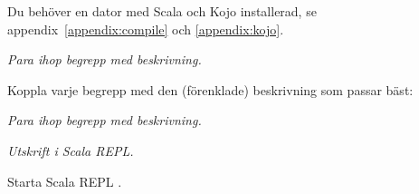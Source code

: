 
\ifPreSolution
\Exercise{\ExeWeekONE}\label{exe:W01}

\begin{Goals}

\end{Goals}

\begin{Preparations}
\item {}
\item Du behöver en dator med Scala och Kojo installerad, se appendix~\ref{appendix:compile} och  \ref{appendix:kojo}.
\end{Preparations}

\else

\ExerciseSolution{\ExeWeekONE}

\fi  %


\BasicTasks


\def\what{\emph{Para ihop begrepp med beskrivning.}}

\QUESTBEGIN

\Task \what

\vspace{1em}\noindent Koppla varje begrepp med den (förenklade) beskrivning som passar bäst: 

\begin{ConceptConnections}

\end{ConceptConnections}

\SOLUTION

\TaskSolved \what

\begin{ConceptConnections}

\end{ConceptConnections}

\QUESTEND






\def\what{\emph{Utskrift i Scala REPL.}}

\QUESTBEGIN

\Task \what 

\vspace{1em}\noindent Starta Scala REPL .


